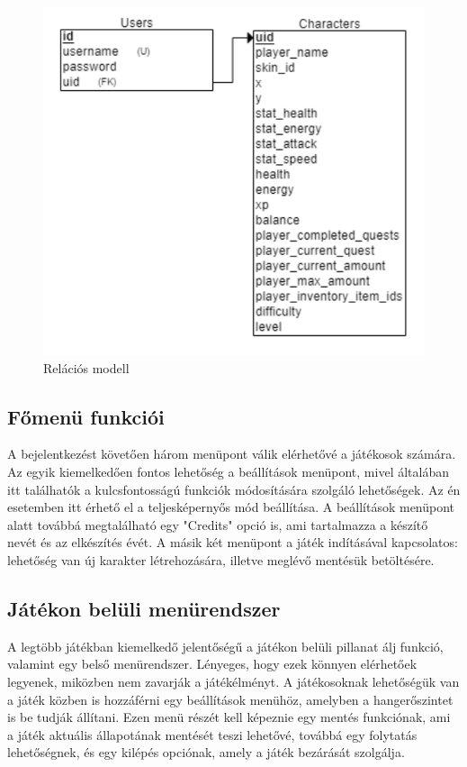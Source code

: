 \begin{figure}[H]
    \centering
    \includegraphics[width=10.0truecm]{images/RelationModell.png}
    \caption{Relációs modell
    \cite{Relációs-modell}}
    \label{fig:Relációs modell}
\end{figure}

\subsection{Főmenü funkciói}

\indent \indent A bejelentkezést követően három menüpont válik elérhetővé a játékosok számára. Az egyik kiemelkedően fontos lehetőség a beállítások menüpont, mivel általában itt találhatók a kulcsfontosságú funkciók módosítására szolgáló lehetőségek. Az én esetemben itt érhető el a teljesképernyős mód beállítása. A beállítások menüpont alatt továbbá megtalálható egy "Credits" opció is, ami tartalmazza a készítő nevét és az elkészítés évét. A másik két menüpont a játék indításával kapcsolatos: lehetőség van új karakter létrehozására, illetve meglévő mentésük betöltésére.

\subsection{Játékon belüli menürendszer}

\indent \indent A legtöbb játékban kiemelkedő jelentőségű a játékon belüli pillanat álj funkció, valamint egy belső menürendszer. Lényeges, hogy ezek könnyen elérhetőek legyenek, miközben nem zavarják a játékélményt. A játékosoknak lehetőségük van a játék közben is hozzáférni egy beállítások menühöz, amelyben a hangerőszintet is be tudják állítani. Ezen menü részét kell képeznie egy mentés funkciónak, ami a játék aktuális állapotának mentését teszi lehetővé, továbbá egy folytatás lehetőségnek, és egy kilépés opciónak, amely a játék bezárását szolgálja.


